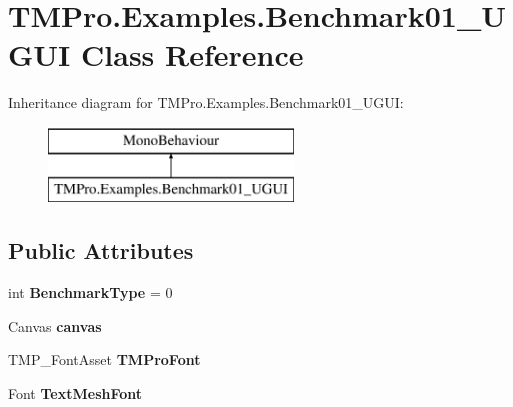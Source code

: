 \hypertarget{class_t_m_pro_1_1_examples_1_1_benchmark01___u_g_u_i}{}\section{T\+M\+Pro.\+Examples.\+Benchmark01\+\_\+\+U\+G\+UI Class Reference}
\label{class_t_m_pro_1_1_examples_1_1_benchmark01___u_g_u_i}
Inheritance diagram for T\+M\+Pro.\+Examples.\+Benchmark01\+\_\+\+U\+G\+UI\+:\begin{figure}[H]
\begin{center}
\leavevmode
\includegraphics[height=2.000000cm]{class_t_m_pro_1_1_examples_1_1_benchmark01___u_g_u_i}
\end{center}
\end{figure}
\subsection*{Public Attributes}
\begin{DoxyCompactItemize}
\item 
\mbox{\label{class_t_m_pro_1_1_examples_1_1_benchmark01___u_g_u_i_a51ddf99f4bea063d19d029efbc672ea8}} 
int {\bfseries Benchmark\+Type} = 0
\item 
\mbox{\label{class_t_m_pro_1_1_examples_1_1_benchmark01___u_g_u_i_a02cfe9754494cce88d818ab75c1da2d9}} 
Canvas {\bfseries canvas}
\item 
\mbox{\label{class_t_m_pro_1_1_examples_1_1_benchmark01___u_g_u_i_a00697aa21ceb618628b504467e786a94}} 
T\+M\+P\+\_\+\+Font\+Asset {\bfseries T\+M\+Pro\+Font}
\item 
\mbox{\label{class_t_m_pro_1_1_examples_1_1_benchmark01___u_g_u_i_a76855aada34fa968c4a26cbe7be9d180}} 
Font {\bfseries Text\+Mesh\+Font}
\end{DoxyCompactItemize}
